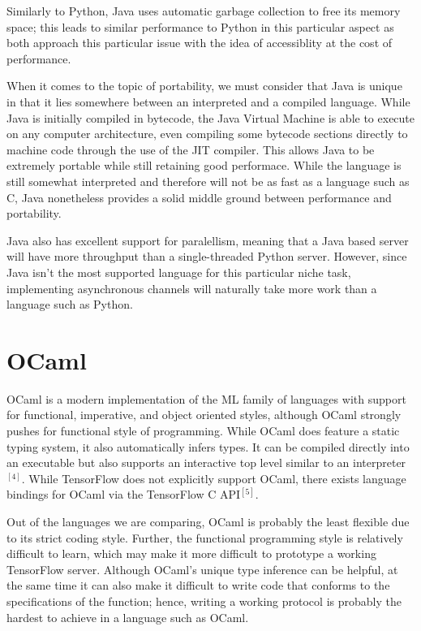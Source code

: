 Similarly to Python, Java uses automatic garbage collection to free its memory space; this leads to similar performance to Python in this particular aspect as both approach this particular issue with the idea of accessiblity at the cost of performance.

When it comes to the topic of portability, we must consider that Java is unique in that it lies somewhere between an interpreted and a compiled language. While Java is initially compiled in bytecode, the Java Virtual Machine is able to execute on any computer architecture, even compiling some bytecode sections directly to machine code through the use of the JIT compiler. This allows Java to be extremely portable while still retaining good performace. While the language is still somewhat interpreted and therefore will not be as fast as a language such as C, Java nonetheless provides a solid middle ground between performance and portability.

Java also has excellent support for paralellism, meaning that a Java based server will have more throughput than a single-threaded Python server. However, since Java isn't the most supported language for this particular niche task, implementing asynchronous channels will naturally take more work than a language such as Python.

\section{OCaml}

OCaml is a modern implementation of the ML family of languages with support for functional, imperative, and object oriented styles, although OCaml strongly pushes for functional style of programming. While OCaml does feature a static typing system, it also automatically infers types. It can be compiled directly into an executable but also supports an interactive top level similar to an interpreter$^{[4]}$. While TensorFlow does not explicitly support OCaml, there exists language bindings for OCaml via the TensorFlow C API$^{[5]}$.

Out of the languages we are comparing, OCaml is probably the least flexible due to its strict coding style. Further, the functional programming style is relatively difficult to learn, which may make it more difficult to prototype a working TensorFlow server. Although OCaml's unique type inference can be helpful, at the same time it can also make it difficult to write code that conforms to the specifications of the function; hence, writing a working protocol is probably the hardest to achieve in a language such as OCaml.

